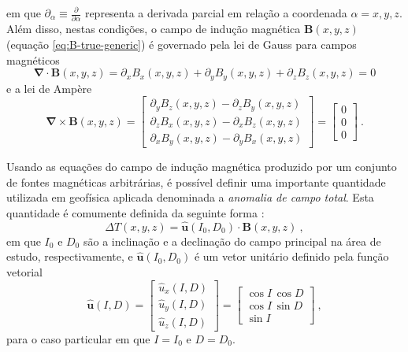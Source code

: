 em que $\partial_{\alpha} \equiv \frac{\partial}{\partial \alpha}$ representa 
a derivada parcial em relação a coordenada $\alpha = x, y, z$.
Além disso, nestas condições, o campo de indução magnética $\mathbf{B}(x, y, z)$ (equação \ref{eq:B-true-generic}) 
é governado pela lei de Gauss para campos magnéticos
\begin{equation}
\boldsymbol{\nabla} \cdot \mathbf{B}(x, y, z) = 
\partial_{x} B_{x}(x, y, z) + \partial_{y} B_{y}(x, y, z) + \partial_{z} B_{z}(x, y, z) = 
0
\label{eq:lei-Gauss}
\end{equation}
e a lei de Ampère
\begin{equation}
\boldsymbol{\nabla} \times \mathbf{B}(x, y, z) = \begin{bmatrix}
\partial_{y} B_{z}(x, y, z) - \partial_{z} B_{y}(x, y, z) \\
\partial_{z} B_{x}(x, y, z) - \partial_{x} B_{z}(x, y, z) \\
\partial_{x} B_{y}(x, y, z) - \partial_{y} B_{x}(x, y, z) 
\end{bmatrix} = 
\begin{bmatrix}
0 \\
0 \\
0
\end{bmatrix} \: .
\label{eq:lei-Ampere}
\end{equation}

Usando as equações do campo de indução magnética produzido por um conjunto de fontes 
magnéticas arbitrárias, é possível definir uma importante quantidade utilizada em  
geofísica aplicada denominada a \textit{anomalia de campo total}. Esta quantidade é
comumente definida da seguinte forma \citep[][ p. 179]{blakely1996}:
\begin{equation}
\Delta T(x, y, z) = \hat{\mathbf{u}}(I_{0}, D_{0}) \cdot \mathbf{B}(x, y, z) \: ,
\label{eq:Delta-T-true}
\end{equation}
em que $I_{0}$ e $D_{0}$ são a inclinação e a declinação do campo principal na área de 
estudo, respectivamente, e $\hat{\mathbf{u}}(I_{0}, D_{0})$ é um vetor unitário definido  
pela função vetorial
\begin{equation}
\hat{\mathbf{u}}(I, D) = 
\begin{bmatrix}
\hat{u}_{x}(I, D) \\
\hat{u}_{y}(I, D) \\
\hat{u}_{z}(I, D) 
\end{bmatrix} = 
\begin{bmatrix}
\cos I \, \cos D \\
\cos I \, \sin D \\
\sin I
\end{bmatrix} \: ,
\label{eq:u-hat}
\end{equation}
para o caso particular em que $I = I_{0}$ e $D = D_{0}$.


